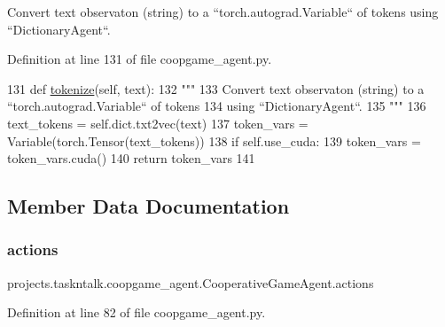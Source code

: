 \begin{DoxyVerb}Convert text observaton (string) to a ``torch.autograd.Variable`` of tokens
using ``DictionaryAgent``.
\end{DoxyVerb}
 

Definition at line 131 of file coopgame\+\_\+agent.\+py.


\begin{DoxyCode}
131     \textcolor{keyword}{def }\hyperlink{namespaceparlai_1_1agents_1_1tfidf__retriever_1_1build__tfidf_a1fdb457e98eb4e4c26047e229686a616}{tokenize}(self, text):
132         \textcolor{stringliteral}{"""}
133 \textcolor{stringliteral}{        Convert text observaton (string) to a ``torch.autograd.Variable`` of tokens}
134 \textcolor{stringliteral}{        using ``DictionaryAgent``.}
135 \textcolor{stringliteral}{        """}
136         text\_tokens = self.dict.txt2vec(text)
137         token\_vars = Variable(torch.Tensor(text\_tokens))
138         \textcolor{keywordflow}{if} self.use\_cuda:
139             token\_vars = token\_vars.cuda()
140         \textcolor{keywordflow}{return} token\_vars
141 
\end{DoxyCode}


\subsection{Member Data Documentation}
\mbox{\label{classprojects_1_1taskntalk_1_1coopgame__agent_1_1CooperativeGameAgent_afc43683bdc26833326ee8b1249f1009a}} 
\subsubsection{\texorpdfstring{actions}{actions}}
{\footnotesize\ttfamily projects.\+taskntalk.\+coopgame\+\_\+agent.\+Cooperative\+Game\+Agent.\+actions}



Definition at line 82 of file coopgame\+\_\+agent.\+py.

\mbox{\label{classprojects_1_1taskntalk_1_1coopgame__agent_1_1CooperativeGameAgent_a821bc77afbc968ce32f4ced5271ffb65}} 
